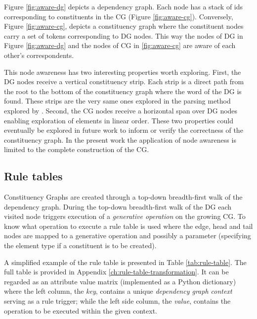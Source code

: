     Figure \ref{fig:aware-dg} depicts a dependency graph. Each node has a stack of ids corresponding to constituents in the CG (Figure \ref{fig:aware-cg}). Conversely, Figure \ref{fig:aware-cg}, depicts a constituency graph where the constituent nodes carry a set of tokens corresponding to DG nodes. This way the nodes of DG in Figure \ref{fig:aware-dg} and the nodes of CG in \ref{fig:aware-cg} are aware of each other's correspondents. 

    This node awareness has two interesting properties worth exploring. First, the DG nodes receive a vertical constituency strip. Each strip is a direct path from the root to the bottom of the constituency graph where the word of the DG is found. These strips are the very same ones explored in the parsing method explored by \citet{Day2007}. Second, the CG nodes receive a horizontal span over DG nodes enabling exploration of elements in linear order. These two properties could eventually be explored in future work to inform or verify the correctness of the constituency graph. In the present work the application of node awareness is limited to the complete construction of the CG.

\subsection{Rule tables}
\label{sec:rule-table}
    Constituency Graphs are created through a top-down breadth-first walk of the dependency graph. During the top-down breadth-first walk of the DG each visited node triggers execution of a \textit{generative operation} on the growing CG. To know what operation to execute a rule table is used where the edge, head and tail nodes are mapped to a generative operation and possibly a parameter (specifying the element type if a constituent is to be created).

    A simplified example of the rule table is presented in Table \ref{tab:rule-table}. The full table is provided in Appendix \ref{ch:rule-table-transformation}. It can be regarded as an attribute value matrix (implemented as a Python dictionary) where the left column, the \textit{key}, contains a unique \textit{dependency graph context} serving as a rule trigger; while the left side column, the \textit{value}, contains the operation to be executed within the given context. 

